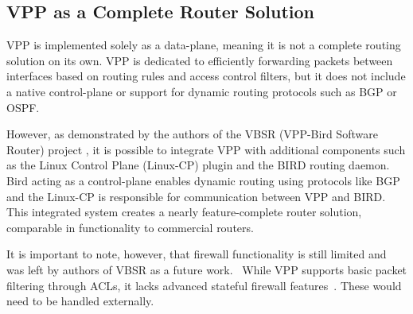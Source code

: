 \subsection{VPP as a Complete Router Solution}
VPP is implemented solely as a data-plane, meaning it is not a complete routing solution on its own. 
VPP is dedicated to efficiently forwarding packets between interfaces based on routing rules and access control filters, 
but it does not include a native control-plane or support for dynamic routing protocols such as BGP or OSPF.

However, as demonstrated by the authors of the VBSR (VPP-Bird Software Router) project \cite{10819057}, 
it is possible to integrate VPP with additional components such as the Linux Control Plane (Linux-CP) plugin and the BIRD routing daemon. 
Bird acting as a control-plane enables dynamic routing using protocols like BGP 
and the Linux-CP is responsible for communication between VPP and BIRD. 
This integrated system creates a nearly feature-complete router solution, comparable in functionality to commercial routers.

It is important to note, however, that firewall functionality is still limited and was left by authors of VBSR as a future work.~\cite{10819057} 
While VPP supports basic packet filtering through ACLs, it lacks advanced stateful firewall features~\cite{fdio-vpp-features-2502}. These would need to be handled externally.

